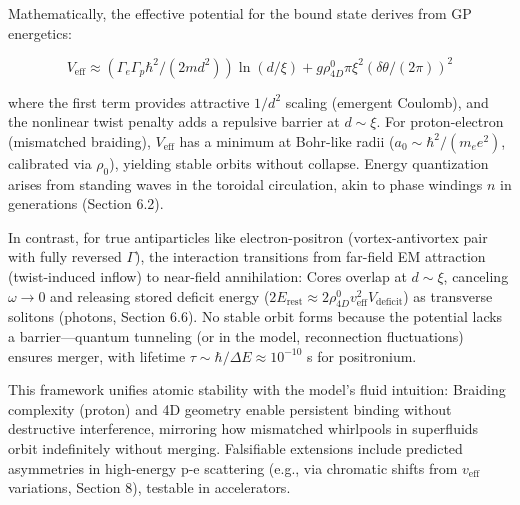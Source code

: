 \documentclass{article}
\begin{document}
Mathematically, the effective potential for the bound state derives from GP energetics:

\[
V_{\text{eff}} \approx (\Gamma_e \Gamma_p \hbar^2 / (2 m d^2)) \ln(d / \xi) + g \rho_{4D}^0 \pi \xi^2 (\delta \theta / (2\pi))^2
\]

where the first term provides attractive $1/d^2$ scaling (emergent Coulomb), and the nonlinear twist penalty adds a repulsive barrier at $d \sim \xi$. For proton-electron (mismatched braiding), $V_{\text{eff}}$ has a minimum at Bohr-like radii ($a_0 \sim \hbar^2 / (m_e e^2)$, calibrated via $\rho_0$), yielding stable orbits without collapse. Energy quantization arises from standing waves in the toroidal circulation, akin to phase windings $n$ in generations (Section 6.2).

In contrast, for true antiparticles like electron-positron (vortex-antivortex pair with fully reversed $\Gamma$), the interaction transitions from far-field EM attraction (twist-induced inflow) to near-field annihilation: Cores overlap at $d \sim \xi$, canceling $\omega \to 0$ and releasing stored deficit energy ($2 E_{\text{rest}} \approx 2 \rho_{4D}^0 v_{\text{eff}}^2 V_{\text{deficit}}$) as transverse solitons (photons, Section 6.6). No stable orbit forms because the potential lacks a barrier—quantum tunneling (or in the model, reconnection fluctuations) ensures merger, with lifetime $\tau \sim \hbar / \Delta E \approx 10^{-10}$ s for positronium.

This framework unifies atomic stability with the model's fluid intuition: Braiding complexity (proton) and 4D geometry enable persistent binding without destructive interference, mirroring how mismatched whirlpools in superfluids orbit indefinitely without merging. Falsifiable extensions include predicted asymmetries in high-energy p-e scattering (e.g., via chromatic shifts from $v_{\text{eff}}$ variations, Section 8), testable in accelerators.
\end{document}
